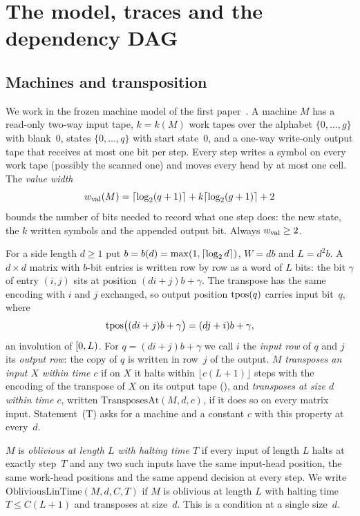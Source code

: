 \section{The model, traces and the dependency DAG}\label{sec:prelim}

\subsection{Machines and transposition}

We work in the frozen machine model of the first paper~\cite{FirstPaper2026}. A machine $M$ has a read-only two-way input
tape, $k=k(M)$ work tapes over the alphabet $\{0,\dots,g\}$ with blank~$0$, states $\{0,\dots,q\}$ with start state~$0$, and a
one-way write-only output tape that receives at most one bit per step. Every step writes a symbol on every work tape (possibly
the scanned one) and moves every head by at most one cell. The \emph{value width}
\[
  w_{\mathrm{val}}(M)=\lceil \log_2 (q+1) \rceil+k\lceil \log_2 (g+1) \rceil+2
\]
bounds the number of bits needed to record what one step does: the new state, the $k$ written symbols and the appended output
bit. Always $w_{\mathrm{val}}\ge2$.

For a side length $d\ge1$ put $b=b(d)=\max(1,\lceil \log_2 d \rceil)$, $W=db$ and $L=d^2b$. A $d\times d$ matrix with $b$-bit entries is
written row by row as a word of $L$ bits: the bit $\gamma$ of entry $(i,j)$ sits at position $(di+j)b+\gamma$. The transpose
has the same encoding with $i$ and $j$ exchanged, so output position $\mathrm{tpos}(q)$ carries input bit~$q$, where
\[
  \mathrm{tpos}\bigl((di+j)b+\gamma\bigr)=(dj+i)b+\gamma ,
\]
an involution of $[0,L)$. For $q=(di+j)b+\gamma$ we call $i$ the \emph{input row} of $q$ and $j$ its \emph{output row}: the
copy of $q$ is written in row~$j$ of the output. $M$ \emph{transposes an input $X$ within time $c$} if on $X$ it halts within
$\lfloor c(L+1)\rfloor$ steps with the encoding of the transpose of $X$ on its output tape (), and
\emph{transposes at size $d$ within time $c$}, written $\mathrm{TransposesAt}(M,d,c)$, if it does so on every matrix input. Statement~(T) asks for a machine and a constant $c$ with this property at every~$d$.

$M$ is \emph{oblivious at length $L$ with halting time $T$} if every input of length $L$ halts at exactly step~$T$ and any two
such inputs have the same input-head position, the same work-head positions and the same append decision at every step. We
write $\mathrm{ObliviousLinTime}(M,d,C,T)$ if $M$ is oblivious at length $L$ with halting time $T\le C(L+1)$ and transposes at
size~$d$. This is a condition at a single size~$d$.

